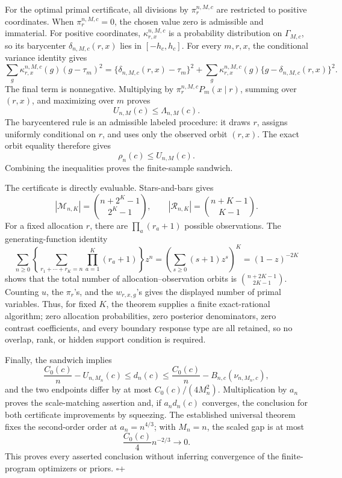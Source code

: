 For the optimal primal certificate, all divisions by \(\pi_r^{n,M,c}\) are restricted to positive coordinates.  When \(\pi_r^{n,M,c}=0\), the chosen value zero is admissible and immaterial.  For positive coordinates, \(\kappa_{r,x}^{n,M,c}\) is a probability distribution on \(\Gamma_{M,c}\), so its barycenter \(\delta_{n,M,c}(r,x)\) lies in \([-h_c,h_c]\).  For every \(m,r,x\), the conditional variance identity gives
\[
 \sum_g\kappa_{r,x}^{n,M,c}(g)(g-\tau_m)^2
 =\{\delta_{n,M,c}(r,x)-\tau_m\}^2
 +\sum_g\kappa_{r,x}^{n,M,c}(g)
 \{g-\delta_{n,M,c}(r,x)\}^2.
\]
The final term is nonnegative.  Multiplying by \(\pi_r^{n,M,c}P_m(x\mid r)\), summing over \((r,x)\), and maximizing over \(m\) proves
\[
 U_{n,M}(c)\leq\Lambda_{n,M}(c).
\]
The barycentered rule is an admissible labeled procedure: it draws \(r\), assigns uniformly conditional on \(r\), and uses only the observed orbit \((r,x)\).  The exact orbit equality therefore gives
\[
 \rho_n(c)\leq U_{n,M}(c).
\]
Combining the inequalities proves the finite-sample sandwich.

The certificate is directly evaluable.  Stars-and-bars gives
\[
 |\mathcal M_{n,K}|=\binom{n+2^K-1}{2^K-1},
 \qquad
 |\mathcal R_{n,K}|=\binom{n+K-1}{K-1}.
\]
For a fixed allocation \(r\), there are \(\prod_a(r_a+1)\) possible observations.  The generating-function identity
\[
 \sum_{n\geq0}\left\{
 \sum_{r_1+\cdots+r_K=n}\prod_{a=1}^K(r_a+1)
 \right\}z^n
 =\left(\sum_{s\geq0}(s+1)z^s\right)^K
 =(1-z)^{-2K}
\]
shows that the total number of allocation--observation orbits is \(\binom{n+2K-1}{2K-1}\).  Counting \(u\), the \(\pi_r\)'s, and the \(w_{r,x,g}\)'s gives the displayed number of primal variables.  Thus, for fixed \(K\), the theorem supplies a finite exact-rational algorithm; zero allocation probabilities, zero posterior denominators, zero contrast coefficients, and every boundary response type are all retained, so no overlap, rank, or hidden support condition is required.

Finally, the sandwich implies
\[
 \frac{C_0(c)}n-U_{n,M_n}(c)
 \leq d_n(c)
 \leq\frac{C_0(c)}n-B_{n,c}(\nu_{n,M_n,c}),
\]
and the two endpoints differ by at most \(C_0(c)/(4M_n^2)\).  Multiplication by \(a_n\) proves the scale-matching assertion and, if \(a_nd_n(c)\) converges, the conclusion for both certificate improvements by squeezing.  The established universal theorem fixes the second-order order at \(a_n=n^{4/3}\); with \(M_n=n\), the scaled gap is at most
\[
 \frac{C_0(c)}4n^{-2/3}\longrightarrow0.
\]
This proves every asserted conclusion without inferring convergence of the finite-program optimizers or priors. \(\square\)+